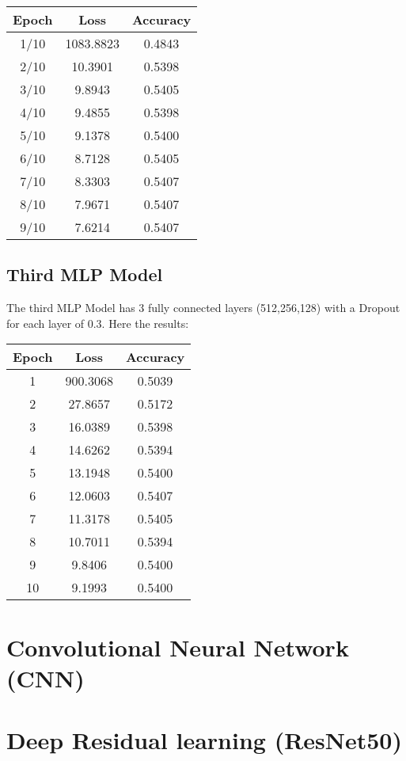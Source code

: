 \begin{center}
\begin{tabular}{|c|c|c|}
\hline
\textbf{Epoch} & \textbf{Loss} & \textbf{Accuracy} \\
\hline
1/10 & 1083.8823 & 0.4843 \\
\hline
2/10 & 10.3901 & 0.5398 \\
\hline
3/10 & 9.8943 & 0.5405 \\
\hline
4/10 & 9.4855 & 0.5398 \\
\hline
5/10 & 9.1378 & 0.5400 \\
\hline
6/10 & 8.7128 & 0.5405 \\
\hline
7/10 & 8.3303 & 0.5407 \\
\hline
8/10 & 7.9671 & 0.5407 \\
\hline
9/10 & 7.6214 & 0.5407 \\
\hline
\end{tabular}
\end{center}
\subsection{Third MLP Model}
The third MLP Model has 3 fully connected layers (512,256,128) with a Dropout for each layer of 0.3. Here the results:
\begin{center}
\begin{tabular}{|c|c|c|}
\hline
Epoch & Loss & Accuracy \\
\hline
1 & 900.3068 & 0.5039 \\
\hline
2 & 27.8657 & 0.5172 \\
\hline
3 & 16.0389 & 0.5398 \\
\hline
4 & 14.6262 & 0.5394 \\
\hline
5 & 13.1948 & 0.5400 \\
\hline
6 & 12.0603 & 0.5407 \\
\hline
7 & 11.3178 & 0.5405 \\
\hline
8 & 10.7011 & 0.5394 \\
\hline
9 & 9.8406 & 0.5400 \\
\hline
10 & 9.1993 & 0.5400 \\
\hline
\end{tabular}
\end{center}

\section{Convolutional Neural Network (CNN)}
\section{Deep Residual learning (ResNet50)}